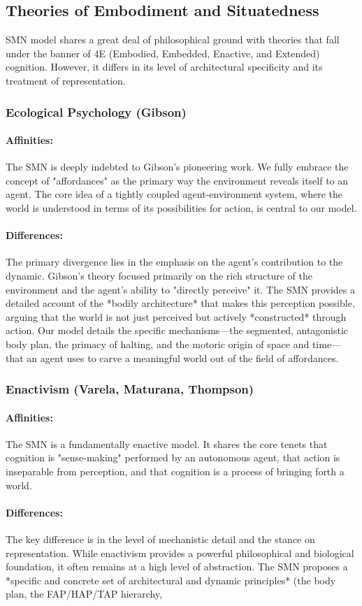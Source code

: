 \n\subsection{Theories of Embodiment and Situatedness}\n\label{subsec:comparison_embodiment}\nThe SMN model shares a great deal of philosophical ground with theories that fall under the banner of 4E (Embodied, Embedded, Enactive, and Extended) cognition. However, it differs in its level of architectural specificity and its treatment of representation.\n\n\subsubsection{Ecological Psychology (Gibson)}\n\label{ssubsec:ecological}\n\paragraph{Affinities:} The SMN is deeply indebted to Gibson's pioneering work. We fully embrace the concept of "affordances" as the primary way the environment reveals itself to an agent. The core idea of a tightly coupled agent-environment system, where the world is understood in terms of its possibilities for action, is central to our model.\n\n\paragraph{Differences:} The primary divergence lies in the emphasis on the agent's contribution to the dynamic. Gibson's theory focused primarily on the rich structure of the environment and the agent's ability to "directly perceive" it. The SMN provides a detailed account of the *bodily architecture* that makes this perception possible, arguing that the world is not just perceived but actively *constructed* through action. Our model details the specific mechanisms—the segmented, antagonistic body plan, the primacy of halting, and the motoric origin of space and time—that an agent uses to carve a meaningful world out of the field of affordances.\n\n\subsubsection{Enactivism (Varela, Maturana, Thompson)}\n\label{ssubsec:enactivism}\n\paragraph{Affinities:} The SMN is a fundamentally enactive model. It shares the core tenets that cognition is "sense-making" performed by an autonomous agent, that action is inseparable from perception, and that cognition is a process of bringing forth a world.\n\n\paragraph{Differences:} The key difference is in the level of mechanistic detail and the stance on representation. While enactivism provides a powerful philosophical and biological foundation, it often remains at a high level of abstraction. The SMN proposes a *specific and concrete set of architectural and dynamic principles* (the body plan, the FAP/HAP/TAP hierarchy, 